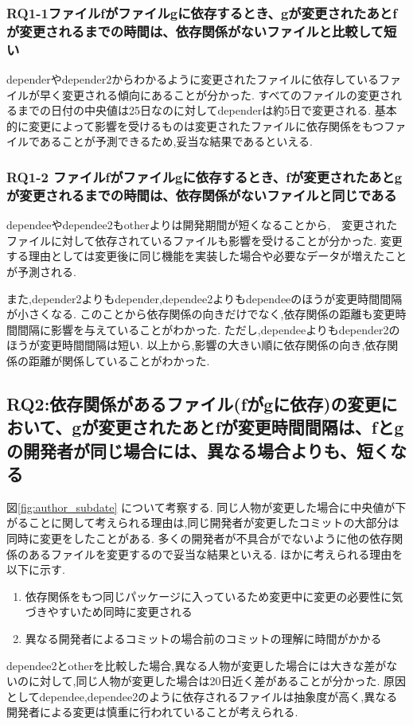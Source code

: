\documentclass{fose2016}           %
\begin{document}
\subsubsection*{RQ1-1ファイルfがファイルgに依存するとき、gが変更されたあとfが変更されるまでの時間は、依存関係がないファイルと比較して短い}
dependerやdepender2からわかるように変更されたファイルに依存しているファイルが早く変更される傾向にあることが分かった.
すべてのファイルの変更されるまでの日付の中央値は25日なのに対してdependerは約5日で変更される.
基本的に変更によって影響を受けるものは変更されたファイルに依存関係をもつファイルであることが予測できるため,妥当な結果であるといえる.

\subsubsection*{RQ1-2 ファイルfがファイルgに依存するとき、fが変更されたあとgが変更されるまでの時間は、依存関係がないファイルと同じである}
dependeeやdependee2もotherよりは開発期間が短くなることから,　変更されたファイルに対して依存されているファイルも影響を受けることが分かった.
変更する理由としては変更後に同じ機能を実装した場合や必要なデータが増えたことが予測される.

また,depender2よりもdepender,dependee2よりもdependeeのほうが変更時間間隔が小さくなる.
このことから依存関係の向きだけでなく,依存関係の距離も変更時間間隔に影響を与えていることがわかった.
ただし,dependeeよりもdepender2のほうが変更時間間隔は短い.
以上から,影響の大きい順に依存関係の向き,依存関係の距離が関係していることがわかった.


\subsection{RQ2:依存関係があるファイル(fがgに依存)の変更において、gが変更されたあとfが変更時間間隔は、fとgの開発者が同じ場合には、異なる場合よりも、短くなる}
図\ref{fig:author_subdate}  について考察する.
同じ人物が変更した場合に中央値が下がることに関して考えられる理由は,同じ開発者が変更したコミットの大部分は同時に変更をしたことがある.
多くの開発者が不具合がでないように他の依存関係のあるファイルを変更するので妥当な結果といえる.
ほかに考えられる理由を以下に示す.
\begin{enumerate}
\item 依存関係をもつ同じパッケージに入っているため変更中に変更の必要性に気づきやすいため同時に変更される
\item 異なる開発者によるコミットの場合前のコミットの理解に時間がかかる
\end{enumerate}
dependee2とotherを比較した場合,異なる人物が変更した場合には大きな差がないのに対して,同じ人物が変更した場合は20日近く差があることが分かった.
原因としてdependee,dependee2のように依存されるファイルは抽象度が高く,異なる開発者による変更は慎重に行われていることが考えられる.
\end{document}
